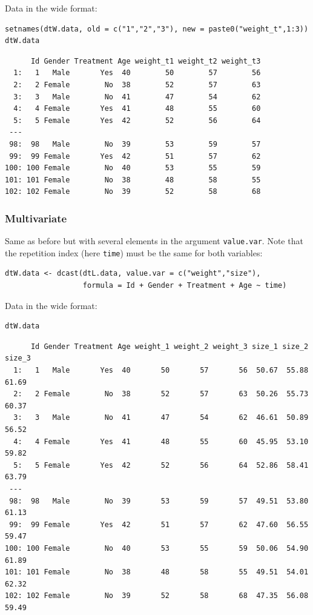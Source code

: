 \documentclass{article}
\begin{document}
Data in the wide format:
\lstset{language=r,label= ,caption= ,captionpos=b,numbers=none}
\begin{lstlisting}
setnames(dtW.data, old = c("1","2","3"), new = paste0("weight_t",1:3))
dtW.data
\end{lstlisting}

\begin{verbatim}
      Id Gender Treatment Age weight_t1 weight_t2 weight_t3
  1:   1   Male       Yes  40        50        57        56
  2:   2 Female        No  38        52        57        63
  3:   3   Male        No  41        47        54        62
  4:   4 Female       Yes  41        48        55        60
  5:   5 Female       Yes  42        52        56        64
 ---                                                       
 98:  98   Male        No  39        53        59        57
 99:  99 Female       Yes  42        51        57        62
100: 100 Female        No  40        53        55        59
101: 101 Female        No  38        48        58        55
102: 102 Female        No  39        52        58        68
\end{verbatim}

\clearpage

\subsubsection{Multivariate}
\label{sec:org82b602b}


Same as before but with several elements in the argument
\texttt{value.var}. Note that the repetition index (here \texttt{time}) must be the
same for both variables:
\lstset{language=r,label= ,caption= ,captionpos=b,numbers=none}
\begin{lstlisting}
dtW.data <- dcast(dtL.data, value.var = c("weight","size"),
				  formula = Id + Gender + Treatment + Age ~ time)
\end{lstlisting}

Data in the wide format:
\lstset{language=r,label= ,caption= ,captionpos=b,numbers=none}
\begin{lstlisting}
dtW.data
\end{lstlisting}

\begin{verbatim}
      Id Gender Treatment Age weight_1 weight_2 weight_3 size_1 size_2 size_3
  1:   1   Male       Yes  40       50       57       56  50.67  55.88  61.69
  2:   2 Female        No  38       52       57       63  50.26  55.73  60.37
  3:   3   Male        No  41       47       54       62  46.61  50.89  56.52
  4:   4 Female       Yes  41       48       55       60  45.95  53.10  59.82
  5:   5 Female       Yes  42       52       56       64  52.86  58.41  63.79
 ---                                                                         
 98:  98   Male        No  39       53       59       57  49.51  53.80  61.13
 99:  99 Female       Yes  42       51       57       62  47.60  56.55  59.47
100: 100 Female        No  40       53       55       59  50.06  54.90  61.89
101: 101 Female        No  38       48       58       55  49.51  54.01  62.32
102: 102 Female        No  39       52       58       68  47.35  56.08  59.49
\end{verbatim}
\end{document}
